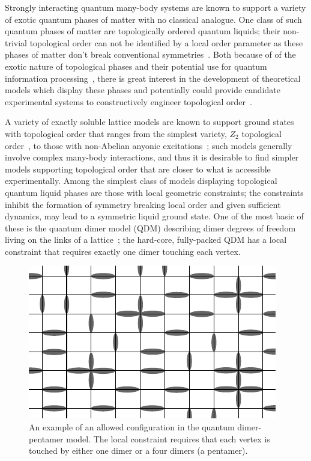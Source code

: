 \documentclass[twocolumn,prb,aps,floatfix,superscriptaddress]{revtex4-1}
\begin{document}
Strongly interacting quantum many-body systems are known to support a variety of exotic quantum phases of matter with no classical analogue. One class of such quantum phases of matter are topologically ordered quantum liquids; their non-trivial topological order can not be identified by a local order parameter as these phases of matter don't break conventional symmetries~\cite{Wen1990,Nayak2008}. Both because of of the exotic nature of topological phases and their potential use for quantum information processing~\cite{Freedman2001,Kitaev2003}, there is great interest in the development of theoretical models which display these phases and potentially could provide candidate experimental systems to constructively engineer topological order~\cite{Duan2003,Jaksch2005,Lewenstein2007,Jiang2008d,Weimer2010a,Herdman2010c,Fowler2012a}. 

A variety of exactly soluble lattice models are known to support ground states with topological order that ranges from the simplest variety, $Z_2$ topological order~\cite{Kitaev2003,Wen2003}, to those with non-Abelian anyonic excitations~\cite{Levin2005a,Kitaev2006a}; such models generally involve complex many-body interactions, and thus it is desirable to find simpler models supporting topological order that are closer to what is accessible experimentally. Among the simplest class of models displaying topological quantum liquid phases are those with local geometric constraints; the constraints inhibit the formation of symmetry breaking local order and given sufficient dynamics, may lead to a symmetric liquid ground state. One of the most basic of these is the quantum dimer model (QDM) describing dimer degrees of freedom living on the links of a lattice~\cite{Rokhsar1988,Moessner2008}; the hard-core, fully-packed QDM has a local constraint that requires exactly one dimer touching each vertex.

\begin{figure}[t!]
    \centering
    \includegraphics[width=0.9\columnwidth]{QDPM_ex_config.pdf}
    \caption{An example of an allowed configuration in the quantum dimer-pentamer model. The local constraint requires that each vertex is touched by either one dimer or a four dimers (a pentamer).}
    \label{fig:QDPMex}
\end{figure}
\end{document}

